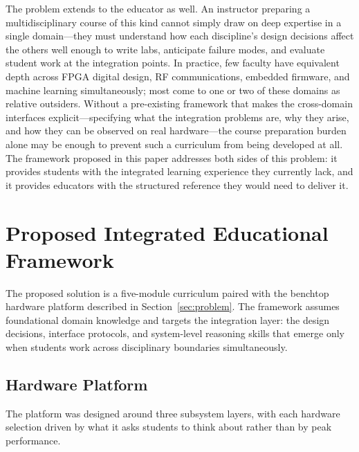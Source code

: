 \documentclass[conference]{IEEEtran}
\begin{document}
The problem extends to the educator as well. An instructor preparing a multidisciplinary course of this kind cannot simply draw on deep expertise in a single domain---they must understand how each discipline's design decisions affect the others well enough to write labs, anticipate failure modes, and evaluate student work at the integration points. In practice, few faculty have equivalent depth across FPGA digital design, RF communications, embedded firmware, and machine learning simultaneously; most come to one or two of these domains as relative outsiders. Without a pre-existing framework that makes the cross-domain interfaces explicit---specifying what the integration problems are, why they arise, and how they can be observed on real hardware---the course preparation burden alone may be enough to prevent such a curriculum from being developed at all. The framework proposed in this paper addresses both sides of this problem: it provides students with the integrated learning experience they currently lack, and it provides educators with the structured reference they would need to deliver it.

\section{Proposed Integrated Educational Framework}\label{sec:framework}

The proposed solution is a five-module curriculum paired with the benchtop hardware platform described in Section~\ref{sec:problem}. The framework assumes foundational domain knowledge and targets the integration layer: the design decisions, interface protocols, and system-level reasoning skills that emerge only when students work across disciplinary boundaries simultaneously.

\subsection{Hardware Platform}

The platform was designed around three subsystem layers, with each hardware selection driven by what it asks students to think about rather than by peak performance.
\end{document}
